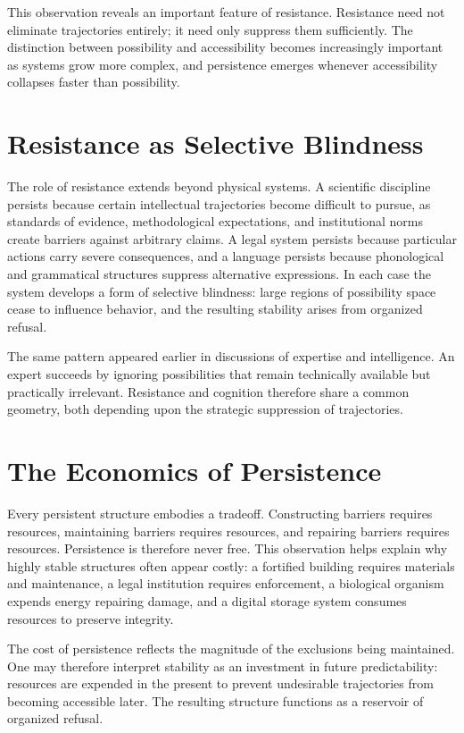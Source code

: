\documentclass[11pt,oneside]{book}
\theoremstyle{plain}
\theoremstyle{definition}
\theoremstyle{remark}
\begin{document}
This observation reveals an important feature of resistance. Resistance need not eliminate trajectories entirely; it need only suppress them sufficiently. The distinction between possibility and accessibility becomes increasingly important as systems grow more complex, and persistence emerges whenever accessibility collapses faster than possibility.

\section{Resistance as Selective Blindness}

The role of resistance extends beyond physical systems. A scientific discipline persists because certain intellectual trajectories become difficult to pursue, as standards of evidence, methodological expectations, and institutional norms create barriers against arbitrary claims. A legal system persists because particular actions carry severe consequences, and a language persists because phonological and grammatical structures suppress alternative expressions. In each case the system develops a form of selective blindness: large regions of possibility space cease to influence behavior, and the resulting stability arises from organized refusal.

The same pattern appeared earlier in discussions of expertise and intelligence. An expert succeeds by ignoring possibilities that remain technically available but practically irrelevant. Resistance and cognition therefore share a common geometry, both depending upon the strategic suppression of trajectories.

\section{The Economics of Persistence}

Every persistent structure embodies a tradeoff. Constructing barriers requires resources, maintaining barriers requires resources, and repairing barriers requires resources. Persistence is therefore never free. This observation helps explain why highly stable structures often appear costly: a fortified building requires materials and maintenance, a legal institution requires enforcement, a biological organism expends energy repairing damage, and a digital storage system consumes resources to preserve integrity.

The cost of persistence reflects the magnitude of the exclusions being maintained. One may therefore interpret stability as an investment in future predictability: resources are expended in the present to prevent undesirable trajectories from becoming accessible later. The resulting structure functions as a reservoir of organized refusal.
\end{document}

